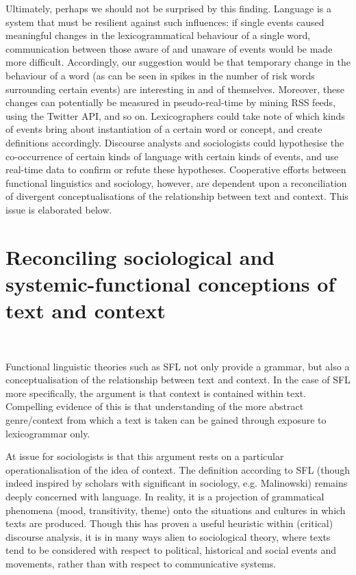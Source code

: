         Ultimately, perhaps we should not be surprised by this finding. Language is a system that must be resilient against such influences: if single events caused meaningful changes in the lexicogrammatical behaviour of a single word, communication between those aware of and unaware of events would be made more difficult. Accordingly, our suggestion would be that temporary change in the behaviour of a word (as can be seen in spikes in the number of risk words surrounding certain events) are interesting in and of themselves. Moreover, these changes can potentially be measured in pseudo-real-time by mining RSS feeds, using the Twitter API, and so on. Lexicographers could take note of which kinds of events bring about instantiation of a certain word or concept, and create definitions accordingly. Discourse analysts and sociologists could hypothesise the co-occurrence of certain kinds of language with certain kinds of events, and use real-time data to confirm or refute these hypotheses. Cooperative efforts between functional linguistics and sociology, however, are dependent upon a reconciliation of divergent conceptualisations of the relationship between text and context. This issue is elaborated below.

        
\section{Reconciling sociological and systemic-functional conceptions of text and context}

	
    ~\ 
    

    Functional linguistic theories such as SFL not only provide a grammar, but also a conceptualisation of the relationship between text and context. In the case of SFL more specifically, the argument is that context is contained within text. Compelling evidence of this is that understanding of the more abstract genre\slash context from which a text is taken can be gained through exposure to lexicogrammar only.

            At issue for sociologists is that this argument rests on a particular operationalisation of the idea of context. The definition according to SFL (though indeed inspired by scholars with significant in sociology, e.g. Malinowski) remains deeply concerned with language. In reality, it is a projection of grammatical phenomena (mood, transitivity, theme) onto the situations and cultures in which texts are produced. Though this has proven a useful heuristic within (critical) discourse analysis, it is in many ways alien to sociological theory, where texts tend to be considered with respect to political, historical and social events and movements, rather than with respect to communicative systems.

